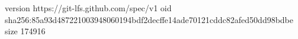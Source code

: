 version https://git-lfs.github.com/spec/v1
oid sha256:85a93d487221003948060194bdf2decffe14ade70121cddc82afed50dd98bdbe
size 174916

